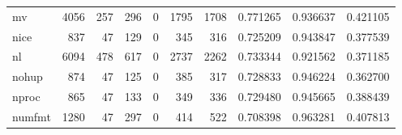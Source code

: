 \begin{tabular}{lrrrrrrrrr}
mv        &                                4056 &                                             257 &                                            296 &                                             0 &                                           1795 &                                         1708 &                                           0.771265 &                               0.936637 &                             0.421105 \\
nice      &                                 837 &                                              47 &                                            129 &                                             0 &                                            345 &                                          316 &                                           0.725209 &                               0.943847 &                             0.377539 \\
nl        &                                6094 &                                             478 &                                            617 &                                             0 &                                           2737 &                                         2262 &                                           0.733344 &                               0.921562 &                             0.371185 \\
nohup     &                                 874 &                                              47 &                                            125 &                                             0 &                                            385 &                                          317 &                                           0.728833 &                               0.946224 &                             0.362700 \\
nproc     &                                 865 &                                              47 &                                            133 &                                             0 &                                            349 &                                          336 &                                           0.729480 &                               0.945665 &                             0.388439 \\
numfmt    &                                1280 &                                              47 &                                            297 &                                             0 &                                            414 &                                          522 &                                           0.708398 &                               0.963281 &                             0.407813 \\

\end{tabular}
